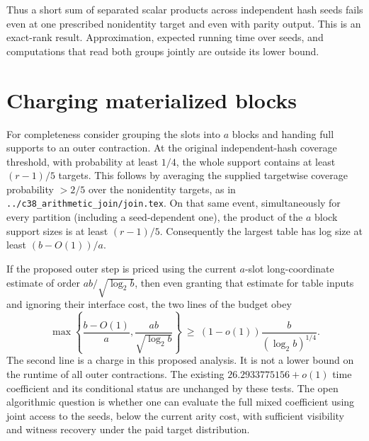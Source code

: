 \documentclass[11pt]{article}
\begin{document}
Thus a short sum of separated scalar products across independent
hash seeds fails even at one prescribed nonidentity target and even
with parity output. This is an exact-rank result. Approximation,
expected running time over seeds, and computations that read both
groups jointly are outside its lower bound.

\section{Charging materialized blocks}
For completeness consider grouping the slots into $a$ blocks and
handing full supports to an outer contraction. At the original
independent-hash coverage threshold, with probability at least $1/4$,
the whole support contains at least $(r-1)/5$ targets. This follows
by averaging the supplied targetwise coverage probability $>2/5$
over the nonidentity targets, as in \texttt{../c38\_arithmetic\_join/join.tex}.
On that same event, simultaneously for every partition (including
a seed-dependent one), the product of the $a$ block support sizes
is at least $(r-1)/5$. Consequently the largest table has log size
at least $(b-O(1))/a$.

If the proposed outer step is priced using the current $a$-slot
long-coordinate estimate of order $ab/\sqrt{\log_2 b}$, then even
granting that estimate for table inputs and ignoring their interface
cost, the two lines of the budget obey
\[
 \max\left\{\frac{b-O(1)}a,\frac{a b}{\sqrt{\log_2 b}}\right\}
 \ \ge\ (1-o(1))\frac{b}{(\log_2 b)^{1/4}} .
\]
The second line is a charge in this proposed analysis. It is not a
lower bound on the runtime of all outer contractions. The existing
$26.2933775156+o(1)$ time coefficient and its conditional status are
unchanged by these tests. The open algorithmic question is whether
one can evaluate the full mixed coefficient using joint access to
the seeds, below the current arity cost, with sufficient visibility
and witness recovery under the paid target distribution.
\end{document}
